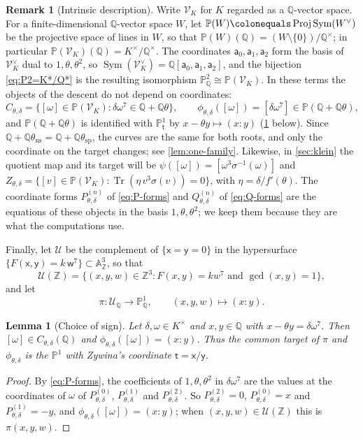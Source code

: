 \documentclass[12pt]{amsart}
\newcommand{\A}{\mathbb{A}}
\renewcommand{\P}{\mathbb{P}}
\newcommand{\PP}{{\mathbb P}}
\newcommand{\Q}{\mathbb{Q}}
\newcommand{\Z}{\mathbb{Z}}
\newcommand{\Pone}{\P^{1}}
\newcommand{\calU}{{\mathcal U}}
\newcommand{\mcU}{\calU}
\newcommand{\calV}{{\mathcal V}}
\newcommand{\x}{\mathsf{x}}
\newcommand{\y}{\mathsf{y}}
\newcommand{\w}{\mathsf{w}}
\renewcommand{\t}{\mathsf{t}}
\newcommand{\sfa}{\mathsf{a}}
\DeclareMathOperator{\ns}{ns}
\DeclareMathOperator{\spc}{sp}
\DeclareMathOperator{\Proj}{Proj}
\DeclareMathOperator{\Sym}{Sym}
\DeclareMathOperator{\Tr}{Tr}
\numberwithin{equation}{section}
\newtheorem{lemma}[theorem]{Lemma}
\theoremstyle{definition}
\newtheorem{remark}[theorem]{Remark}
\begin{document}
\begin{remark}[Intrinsic description]
  \label{rem:intrinsic}
  Write $\calV_K$ for $K$ regarded as a $\Q$-vector space. For a
  finite-dimensional $\Q$-vector space $W$, let
  $\PP(W) \colonequals \Proj \Sym(W^{\vee})$ be the projective space of lines
  in $W$, so that $\PP(W)(\Q) = (W \setminus \{0\})/\Q^{\times}$; in
  particular $\PP(\calV_K)(\Q) = K^{\times}/\Q^{\times}$. The coordinates
  $\sfa_0, \sfa_1, \sfa_2$ form the basis of $\calV_K^{\vee}$ dual to
  $1, \theta, \theta^2$, so $\Sym(\calV_K^{\vee}) = \Q[\sfa_0,\sfa_1,\sfa_2]$,
  and the bijection \cref{eq:P2=K*/Q*} is the resulting isomorphism
  $\PP^2_{\Q} \cong \PP(\calV_K)$. In these terms the objects of
  the descent do not depend on coordinates:
  \[
    C_{\theta,\delta} = \bigl\{[\omega] \in \PP(\calV_K) : \delta\omega^{7} \in \Q + \Q\theta\bigr\},
    \qquad
    \phi_{\theta,\delta}([\omega]) = [\delta\omega^{7}] \in \PP(\Q + \Q\theta),
  \]
  and $\PP(\Q + \Q\theta)$ is identified with $\Pone_{\t}$ by $x - \theta y
  \mapsto (x : y)$ (\cref{lem:sign} below). Since $\Q + \Q\theta_{\ns} = \Q +
  \Q\theta_{\spc}$, the curves are the same for both roots, and only the
  coordinate on the target changes; see \cref{lem:one-family}. Likewise, in
  \cref{sec:klein} the quotient map and its target will be
  $\psi([\omega]) = [\omega^{3}\sigma^{-1}(\omega)]$ and $Z_{\theta,\delta} =
  \{[v] \in \PP(\calV_K) : \Tr(\eta\, v^{3}\sigma(v)) = 0\}$, with $\eta =
  \delta/f'(\theta)$. The coordinate forms $P^{(n)}_{\theta,\delta}$ of
  \cref{eq:P-forms} and $Q^{(n)}_{\theta,\delta}$ of \cref{eq:Q-forms} are the
  equations of these objects in the basis
  $1, \theta, \theta^2$; we keep them because they are what the computations
  use.
\end{remark}

Finally, let $\mcU$ be the complement of $\{\x = \y = 0\}$ in the hypersurface
$\{F(\x,\y) = k\,\w^7\} \subset \A^3_{\Z}$, so that
\[
  \mcU(\Z) = \bigl\{(x,y,w) \in \Z^3 : F(x,y) = kw^7 \text{ and } \gcd(x,y) = 1\bigr\},
\]
and let
\[
  \pi \colon \mcU_{\Q} \to \Pone_{\Q}, \qquad (x,y,w) \mapsto (x:y) .
\]

\begin{lemma}[Choice of sign]
  \label{lem:sign}
  Let $\delta, \omega \in K^{\times}$ and $x, y \in \Q$ with
  $x - \theta y = \delta\omega^7$. Then $[\omega] \in C_{\theta,\delta}(\Q)$ and
  $\phi_{\theta,\delta}([\omega]) = (x:y)$. Thus the common target of $\pi$ and
  $\phi_{\theta,\delta}$ is the $\Pone$ with Zywina's coordinate $\t = \x/\y$.
\end{lemma}
\begin{proof}
  By \cref{eq:P-forms}, the coefficients of $1, \theta, \theta^2$ in
  $\delta\omega^7$ are the values at the coordinates of $\omega$ of
  $P^{(0)}_{\theta,\delta}$, $P^{(1)}_{\theta,\delta}$ and
  $P^{(2)}_{\theta,\delta}$. So $P^{(2)}_{\theta,\delta} = 0$,
  $P^{(0)}_{\theta,\delta} = x$ and $P^{(1)}_{\theta,\delta} = -y$, and
  $\phi_{\theta,\delta}([\omega]) = (x : y)$; when $(x,y,w) \in \mcU(\Z)$ this is
  $\pi(x,y,w)$.
\end{proof}
\end{document}
